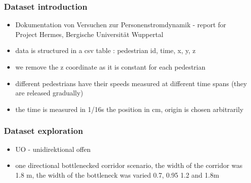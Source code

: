 \begin{frame}
    \frametitle{Dataset introduction}
    \begin{itemize}
    \item Dokumentation von Versuchen zur Personenstromdynamik - report for Project Hermes, Bergische Universit{\"a}t Wuppertal
    \item data is structured in a csv table : pedestrian id, time, x, y, z 
    \item we remove the z coordinate as it is constant for each pedestrian
    \item different pedestrians have their speeds measured at different time spans (they are released gradually)
    \item the time is measured in 1/16s the position in cm, origin is chosen arbitrarily
    \end{itemize}

    \begin{figure}
        \centering
    \end{figure}
\end{frame}

\begin{frame}
    \frametitle{Dataset exploration}
    \begin{itemize}
        \item UO - unidirektional offen 
        \item one directional bottlenecked corridor scenario, the width of the corridor was 1.8 m, the width of the bottleneck was varied 0.7, 0.95 1.2 and 1.8m
    \end{itemize}
    \begin{figure}
        \centering
    \end{figure}
\end{frame}

